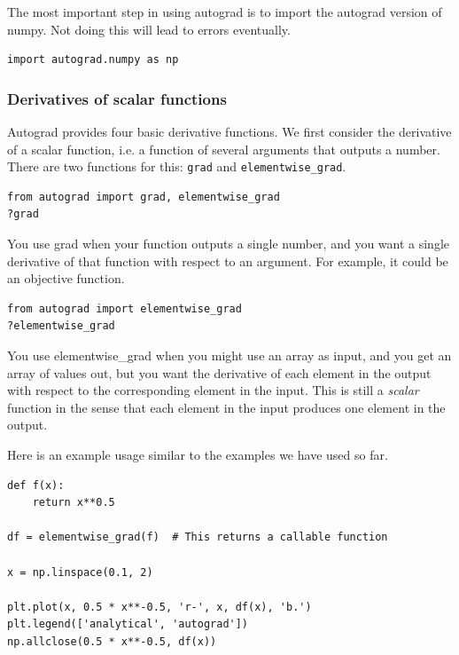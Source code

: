 \documentclass[11pt]{article}
\begin{document}
The most important step in using autograd is to import the autograd version of numpy. Not doing this will lead to errors eventually.

\begin{verbatim}
import autograd.numpy as np
\end{verbatim}

\subsubsection{Derivatives of scalar functions}
\label{sec:org170d0d0}

Autograd provides four basic derivative functions. We first consider the derivative of a scalar function, i.e. a function of several arguments that outputs a number. There are two functions for this: \texttt{grad} and \texttt{elementwise\_grad}.

\begin{verbatim}
from autograd import grad, elementwise_grad
?grad
\end{verbatim}

You use grad when your function outputs a single number, and you want a single derivative of that function with respect to an argument. For example, it could be an objective function.


\begin{verbatim}
from autograd import elementwise_grad
?elementwise_grad
\end{verbatim}

You use elementwise\_grad when you might use an array as input, and you get an array of values out, but you want the derivative of each element in the output with respect to the corresponding element in the input. This is still a \emph{scalar} function in the sense that each element in the input produces one element in the output.

Here is an example usage similar to the examples we have used so far.

\begin{verbatim}
def f(x):
    return x**0.5

df = elementwise_grad(f)  # This returns a callable function

x = np.linspace(0.1, 2)

plt.plot(x, 0.5 * x**-0.5, 'r-', x, df(x), 'b.')
plt.legend(['analytical', 'autograd'])
np.allclose(0.5 * x**-0.5, df(x))
\end{verbatim}
\end{document}
